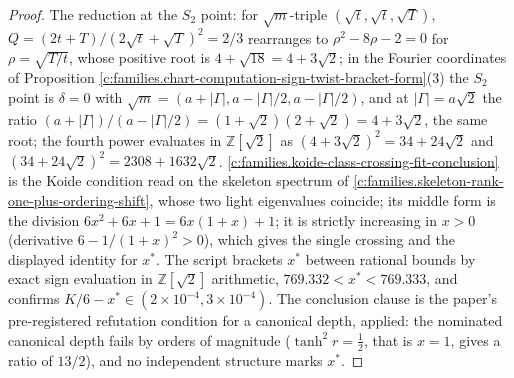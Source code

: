 \documentclass[11pt]{article}
\theoremstyle{definition}
\theoremstyle{plain}
\begin{document}
\begin{proof}
The reduction at the $S_{2}$ point: for $\sqrt{m}$-triple $(\sqrt{t}, \sqrt{t}, \sqrt{T})$, $Q = (2t + T)/(2\sqrt{t} + \sqrt{T})^{2} = 2/3$ rearranges to $\rho^{2} - 8\rho - 2 = 0$ for $\rho = \sqrt{T/t}$, whose positive root is $4 + \sqrt{18} = 4 + 3\sqrt{2}$; in the Fourier coordinates of Proposition \ref{c:families.chart-computation-sign-twist-bracket-form}(3) the $S_{2}$ point is $\delta = 0$ with $\sqrt{m} = (a + |\Gamma|, a - |\Gamma|/2, a - |\Gamma|/2)$, and at $|\Gamma| = a\sqrt{2}$ the ratio $(a + |\Gamma|)/(a - |\Gamma|/2) = (1 + \sqrt{2})(2 + \sqrt{2}) = 4 + 3\sqrt{2}$, the same root; the fourth power evaluates in $\mathbb{Z}[\sqrt{2}]$ as $(4+3\sqrt{2})^{2} = 34 + 24\sqrt{2}$ and $(34+24\sqrt{2})^{2} = 2308 + 1632\sqrt{2}$. \ref{c:families.koide-class-crossing-fit-conclusion} is the Koide condition read on the skeleton spectrum of \ref{c:families.skeleton-rank-one-plus-ordering-shift}, whose two light eigenvalues coincide; its middle form is the division $6x^{2} + 6x + 1 = 6x(1+x) + 1$; it is strictly increasing in $x > 0$ (derivative $6 - 1/(1+x)^{2} > 0$), which gives the single crossing and the displayed identity for $x^{*}$. The script brackets $x^{*}$ between rational bounds by exact sign evaluation in $\mathbb{Z}[\sqrt{2}]$ arithmetic, $769.332 < x^{*} < 769.333$, and confirms $K/6 - x^{*} \in (2 \times 10^{-4}, 3 \times 10^{-4})$. The conclusion clause is the paper's pre-registered refutation condition for a canonical depth, applied: the nominated canonical depth fails by orders of magnitude ($\tanh^{2}r = \tfrac12$, that is $x = 1$, gives a ratio of $13/2$), and no independent structure marks $x^{*}$.

\end{proof}
\end{document}
